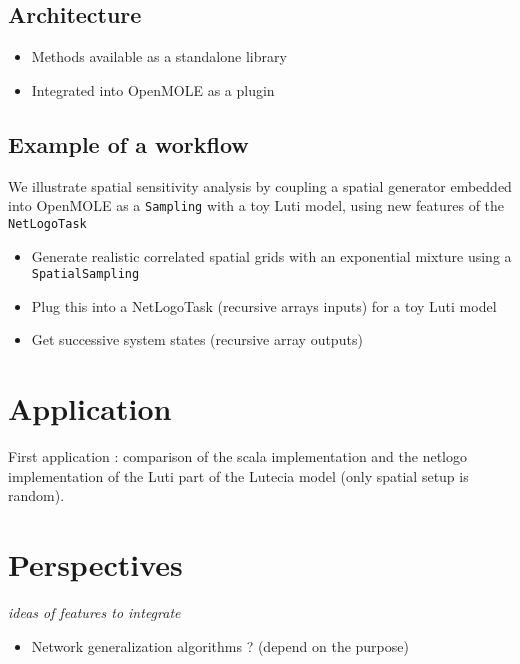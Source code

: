 \subsection{Architecture}

\begin{itemize}
	\item Methods available as a standalone library
	\item Integrated into OpenMOLE as a plugin
\end{itemize}



\subsection{Example of a workflow}

We illustrate spatial sensitivity analysis by coupling a spatial generator embedded into OpenMOLE as a \texttt{Sampling} with a toy Luti model, using new features of the \texttt{NetLogoTask}

\begin{itemize}
	\item Generate realistic correlated spatial grids with an exponential mixture using a \texttt{SpatialSampling}
	\item Plug this into a NetLogoTask (recursive arrays inputs) for a toy Luti model
	\item Get successive system states (recursive array outputs)
\end{itemize}




\section{Application}

First application : comparison of the scala implementation and the netlogo implementation of the Luti part of the Lutecia model (only spatial setup is random).




\section{Perspectives}

\textit{ideas of features to integrate}

\begin{itemize}
	\item Network generalization algorithms ? (depend on the purpose)
\end{itemize}










